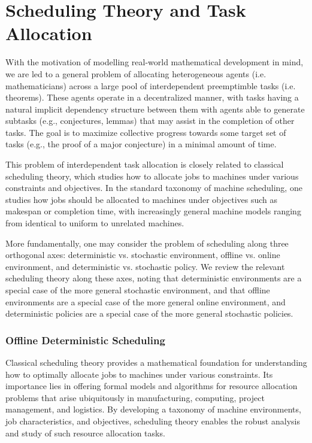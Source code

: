 \chapter{Scheduling Theory and Task Allocation}\label{chap:schedulingtheory}

With the motivation of modelling real-world mathematical development in mind, we are led to a general problem of allocating heterogeneous agents (i.e. mathematicians) across a large pool of interdependent preemptimble tasks (i.e. theorems). These agents operate in a decentralized manner, with tasks having a natural implicit dependency structure between them with agents able to generate subtasks (e.g., conjectures, lemmas) that may assist in the completion of other tasks. The goal is to maximize collective progress towards some target set of tasks (e.g., the proof of a major conjecture) in a minimal amount of time.

This problem of interdependent task allocation is closely related to classical scheduling theory, which studies how to allocate jobs to machines under various constraints and objectives. In the standard taxonomy of machine scheduling, one studies how jobs should be allocated to machines under objectives such as makespan or completion time, with increasingly general machine models ranging from identical to uniform to unrelated machines. 

More fundamentally, one may consider the problem of scheduling along three orthogonal axes: deterministic vs. stochastic environment, offline vs. online environment, and deterministic vs. stochastic policy. We review the relevant scheduling theory along these axes, noting that deterministic environments are a special case of the more general stochastic environment, and that offline environments are a special case of the more general online environment, and deterministic policies are a special case of the more general stochastic policies.

\subsection{Offline Deterministic Scheduling}
Classical scheduling theory provides a mathematical foundation for understanding how to optimally allocate jobs to machines under various constraints. Its importance lies in offering formal models and algorithms for resource allocation problems that arise ubiquitously in manufacturing, computing, project management, and logistics. By developing a taxonomy of machine environments, job characteristics, and objectives, scheduling theory enables the robust analysis and study of such resource allocation tasks.

